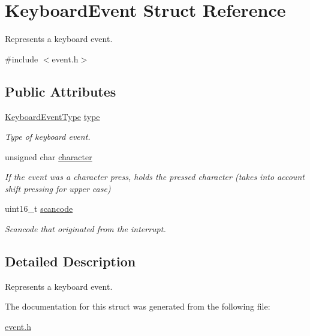 \hypertarget{struct_keyboard_event}{}\section{Keyboard\+Event Struct Reference}
\label{struct_keyboard_event}


Represents a keyboard event.  




{\ttfamily \#include $<$event.\+h$>$}

\subsection*{Public Attributes}
\begin{DoxyCompactItemize}
\item 
\mbox{\hyperlink{group__event_ga65afc57ec37493fc7409f26a189ab104}{Keyboard\+Event\+Type}} \mbox{\hyperlink{group__event_ga88ca71424bb0d59efe2a10e65cdb52f0}{type}}
\begin{DoxyCompactList}\small\item\em Type of keyboard event. \end{DoxyCompactList}\item 
unsigned char \mbox{\hyperlink{group__event_gaadaa71d48b0af51dc033410dac4b204e}{character}}
\begin{DoxyCompactList}\small\item\em If the event was a character press, holds the pressed character (takes into account shift pressing for upper case) \end{DoxyCompactList}\item 
uint16\+\_\+t \mbox{\hyperlink{group__event_gad4aa052be4d1b19f7729750811c00938}{scancode}}
\begin{DoxyCompactList}\small\item\em Scancode that originated from the interrupt. \end{DoxyCompactList}\end{DoxyCompactItemize}


\subsection{Detailed Description}
Represents a keyboard event. 

The documentation for this struct was generated from the following file\+:\begin{DoxyCompactItemize}
\item 
\mbox{\hyperlink{event_8h}{event.\+h}}\end{DoxyCompactItemize}
